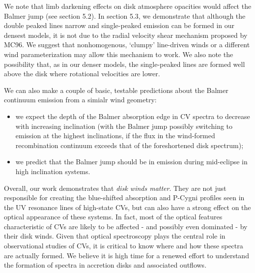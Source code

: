 \documentclass[preprint, a4paper, 11pt]{aastex}
\begin{document}
We note that limb darkening effects on disk atmosphere opacities
would affect the Balmer jump (see section 5.2). In section 5.3, we demonstrate that
although the double peaked lines narrow and 
single-peaked emission can be formed in our densest models, 
it is not due to the radial velocity shear mechanism proposed by MC96.
We suggest that nonhomogenous, `clumpy' line-driven winds or a different
wind parameterization may allow this mechanism to work.
We also note the possibility that, as in our denser models, 
the single-peaked lines are formed well above the disk where 
rotational velocities are lower.



We can also make a couple of basic,
testable predictions about the Balmer continuum emission
from a simialr wind geometry:
\begin{itemize}
	\item we expect the depth of the Balmer absorption edge in CV
          spectra to decrease with increasing inclination (with the
          Balmer jump possibly switching to emission at the highest
          inclinations, if the flux in the wind-formed recombination
          continuum exceeds that of the foreshortened disk spectrum);
	\item we predict that the Balmer jump should be in emission
          during mid-eclipse in high inclination systems.
\end{itemize}

\smallskip


Overall, our work demonstrates that {\sl disk winds matter}. They are
not just responsible for creating the blue-shifted absorption and
P-Cygni profiles seen in the UV resonance lines of high-state CVs, but
can also have a strong effect on the optical appearance of these
systems. In fact, most of the optical features characteristic of CVs
are likely to be affected - and possibly even dominated - by their disk
winds. Given that optical spectroscopy plays the central role in
observational studies of CVs, it is critical to know 
where and how these spectra are actually formed. We believe it is high
time for a renewed effort to understand the formation of spectra in
accretion disks and associated outflows. 
\end{document}
